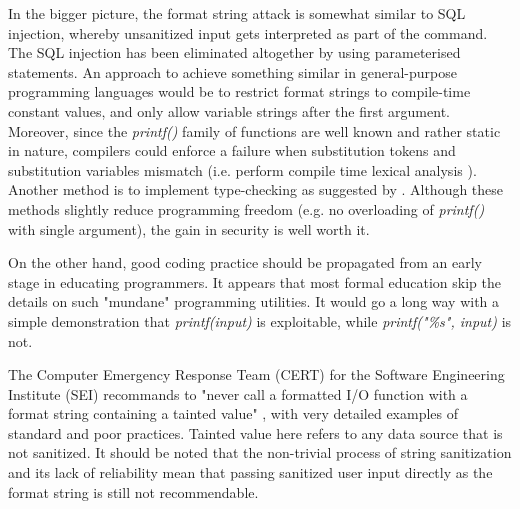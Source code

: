 In the bigger picture, the format string attack is somewhat similar to SQL injection, whereby unsanitized input gets interpreted as part of the command. The SQL injection has been eliminated altogether by using parameterised statements. An approach to achieve something similar in general-purpose programming languages would be to restrict format strings to compile-time constant values, and only allow variable strings after the first argument. Moreover, since the \emph{printf()} family of functions are well known and rather static in nature, compilers could enforce a failure when substitution tokens and substitution variables mismatch (i.e. perform compile time lexical analysis \cite{alanpscan}). Another method is to implement type-checking as suggested by \cite{Weitz2014}. Although these methods slightly reduce programming freedom (e.g. no overloading of \emph{printf()} with single argument), the gain in security is well worth it.

On the other hand, good coding practice should be propagated from an early stage in educating programmers. It appears that most formal education skip the details on such "mundane" programming utilities. It would go a long way with a simple demonstration that \emph{printf(input)} is exploitable, while \emph{printf("\%s", input)} is not.

The Computer Emergency Response Team (CERT) for the Software Engineering Institute (SEI) recommands to "never call a formatted I/O function with a format string containing a tainted value" \cite{burch_cert}, with very detailed examples of standard and poor practices. Tainted value here refers to any data source that is not sanitized. It should be noted that the non-trivial process of string sanitization and its lack of reliability mean that passing sanitized user input directly as the format string is still not recommendable.